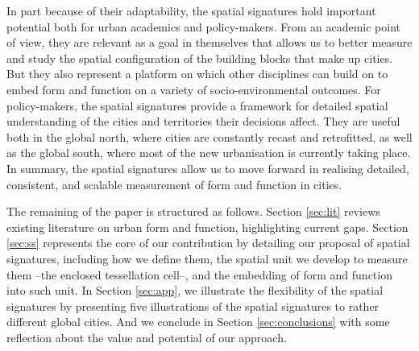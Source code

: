 In part because of their adaptability,
the spatial signatures hold important potential both for urban academics and
policy-makers.
From an academic point of view, they are relevant as a goal in themselves
that allows us to better measure and study the spatial configuration of the
building blocks that make up cities. But they also represent a platform on
which other disciplines can build on to embed form and function on a variety
of socio-environmental outcomes.
For policy-makers, the spatial signatures provide a framework for detailed
spatial understanding of the cities and territories their decisions affect.
They are useful both in the global
north, where cities are constantly recast and retrofitted, as well as the
global south, where most of the new urbanisation is currently taking place.
%
In summary, the spatial signatures allow us to move forward in realising
detailed, consistent, and scalable measurement of form and function in
cities.

The remaining of the paper is structured as follows. Section \ref{sec:lit}
reviews existing literature on urban form and function, highlighting current
gaps. Section \ref{sec:ss} represents the core of our contribution by detailing
our proposal of spatial signatures,
including how we define them, the spatial unit we develop to
measure them --the enclosed tessellation cell--, and the embedding of form and
function into such unit. In Section \ref{sec:app}, we illustrate the
flexibility of the spatial signatures by presenting five illustrations of the
spatial signatures to rather different global cities. And we conclude in Section
\ref{sec:conclusions} with some reflection about the value and potential of
our approach.








